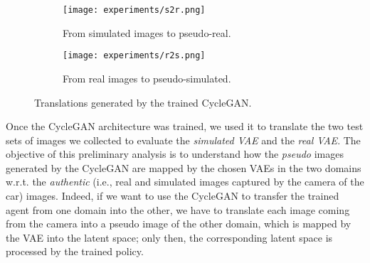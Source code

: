 
\begin{figure}[h]
  \centering
  \begin{subfigure}{.6\linewidth}
      \centering
      \texttt{[image: experiments/s2r.png]}
      \caption{From simulated images to pseudo-real.}\label{fig:s2r}
  \end{subfigure}
      \hfill
  \begin{subfigure}{.6\linewidth}
      \centering
      \texttt{[image: experiments/r2s.png]}
      \caption{From real images to pseudo-simulated.}\label{fig:r2s}
  \end{subfigure}
  \caption{Translations generated by the trained CycleGAN.}
  \label{fig:cycleganexample}
\end{figure}

Once the CycleGAN architecture was trained, we used it to translate the two test sets of images we collected to evaluate the \textit{simulated VAE} and the \textit{real VAE}. The objective of this preliminary analysis is to understand how the \textit{pseudo} images generated by the CycleGAN are mapped by the chosen VAEs in the two domains w.r.t. the \textit{authentic} (i.e., real and simulated images captured by the camera of the car) images. Indeed, if we want to use the CycleGAN to transfer the trained agent from one domain into the other, we have to translate each image coming from the camera into a pseudo image of the other domain, which is mapped by the VAE into the latent space; only then, the corresponding latent space is processed by the trained policy.

